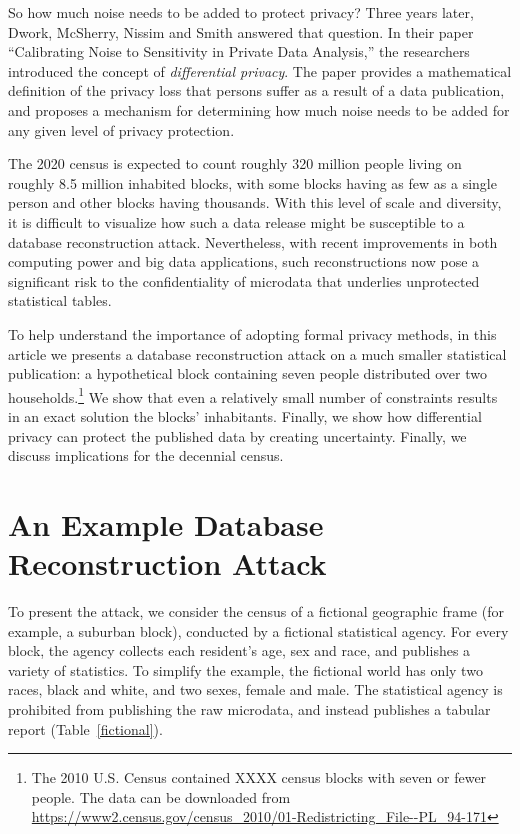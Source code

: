 \documentclass[runningheads]{llncs}
\begin{document}
So how much noise needs to be added to protect privacy? Three years
later, Dwork, McSherry, Nissim and Smith answered that question. In
their paper ``Calibrating Noise to Sensitivity in Private Data
Analysis,''\cite{Dwork:2006:CNS:2180286.2180305} the researchers
introduced the concept of \emph{differential privacy}. The paper
provides a mathematical definition of the privacy loss that
persons suffer as a result of a data publication, and proposes a
mechanism for determining how much noise needs to be added for any
given level of privacy protection.

The 2020 census is expected to count roughly 320 million people living
on roughly 8.5 million inhabited blocks, with some blocks having as
few as a single person and other blocks having thousands. With this
level of scale and diversity, it is difficult to visualize how such a
data release might be susceptible to a database reconstruction
attack. Nevertheless, with recent improvements in both computing power
and big data applications, such reconstructions now pose a significant
risk to the confidentiality of microdata that underlies unprotected
statistical tables.

To help understand the importance of adopting formal privacy methods, in
this article we presents a database reconstruction attack on a much
smaller statistical publication: a hypothetical block containing seven
people distributed over two households.\footnote{The 2010 U.S. Census contained XXXX census blocks with seven or fewer people. The data can be downloaded from \url{https://www2.census.gov/census_2010/01-Redistricting_File--PL_94-171}} We show that even a relatively
small number of constraints results in an exact solution the blocks'
inhabitants. Finally, we show how differential privacy can protect the
published data by creating uncertainty. Finally, we discuss
implications for the decennial census.

\section{An Example Database Reconstruction Attack}

To present the attack, we consider the 
census of a fictional geographic frame (for example, a suburban block),
conducted by a fictional statistical
agency. For every block, the agency collects each resident's age,
sex and race, and publishes a variety of statistics. To simplify the example,
the fictional world has only two races, black and white, and two
sexes, female and male. The statistical agency
is prohibited from publishing the raw microdata, and instead publishes
a tabular report (Table~\ref{fictional}). 
\end{document}
